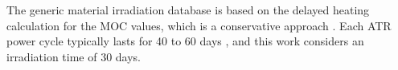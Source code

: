 The generic material irradiation database is based on the delayed heating calculation for the \gls*{MOC} values, which is a conservative approach \cite{ilas_impact_2013}.
Each ATR power cycle typically lasts for 40 to 60 days \cite{sterbentz_agr1_2018}, and this work considers an irradiation time of 30 days.




